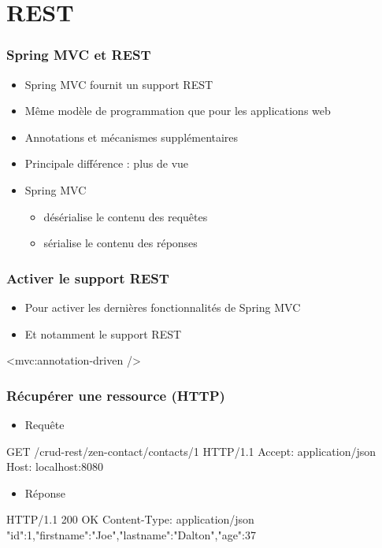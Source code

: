\section{REST}


\begin{frame}
 \frametitle{Spring MVC et REST}
 \begin{itemize}
  \item Spring MVC fournit un support REST
  \item Même modèle de programmation que pour les applications web
  \item Annotations et mécanismes supplémentaires
  \item Principale différence : plus de vue
  \item Spring MVC
  \begin{itemize}
   \item désérialise le contenu des requêtes
   \item sérialise le contenu des réponses
  \end{itemize}
 \end{itemize}
\end{frame}

\begin{frame}[fragile]
 \frametitle{Activer le support REST}
 
 \begin{itemize}
  \item Pour activer les dernières fonctionnalités de Spring MVC
  \item Et notamment le support REST
 \end{itemize} 
 
 \begin{xmlcode}
<mvc:annotation-driven />
 \end{xmlcode}

\end{frame}

\begin{frame}[fragile]
 \frametitle{Récupérer une ressource (HTTP)}
 
 \begin{itemize}
  \item Requête
 \end{itemize} 
 
 \begin{textcode}
GET /crud-rest/zen-contact/contacts/1 HTTP/1.1
Accept: application/json
Host: localhost:8080
 \end{textcode}
 
  \begin{itemize}
  \item Réponse
 \end{itemize} 
 
 \begin{textcode}
HTTP/1.1 200 OK
Content-Type: application/json
{"id":1,"firstname":"Joe","lastname":"Dalton","age":37}
 \end{textcode}

\end{frame}

